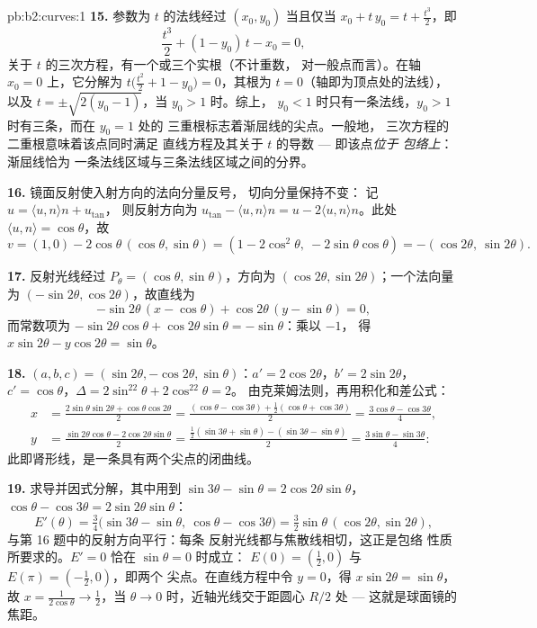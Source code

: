 \begin{solution}{pb:b2:curves:1}
\textbf{15.} 参数为 $t$ 的法线经过
$(x_0, y_0)$ 当且仅当 $x_0 + t\,y_0 = t + \tfrac{t^3}2$，即
\[
\frac{t^3}2 + (1 - y_0)\,t - x_0 = 0 ,
\]
关于 $t$ 的三次方程，有一个或三个实根（不计重数，
对一般点而言）。在轴 $x_0 = 0$ 上，它分解为
$t\bigl(\tfrac{t^2}2 + 1 - y_0\bigr) = 0$，其根为
$t = 0$（轴即为顶点处的法线），以及
$t = \pm\sqrt{2(y_0 - 1)}$，当 $y_0 > 1$ 时。综上，
$y_0 < 1$ 时只有一条法线，$y_0 > 1$ 时有三条，而在 $y_0 = 1$ 处的
三重根标志着渐屈线的尖点。一般地，
三次方程的二重根意味着该点同时满足
直线方程及其关于 $t$ 的导数 --- 即该点\emph{位于
包络上}：渐屈线恰为
一条法线区域与三条法线区域之间的分界。

\textbf{16.} 镜面反射使入射方向的法向分量反号，
切向分量保持不变：
记 $u = \langle u, n\rangle n + u_{\mathrm{tan}}$，
则反射方向为 $u_{\mathrm{tan}} - \langle u,
n\rangle n = u - 2\langle u, n\rangle n$。此处 $\langle u,
n\rangle = \cos\theta$，故
\[
v = (1, 0) - 2\cos\theta\,(\cos\theta, \sin\theta)
= (1 - 2\cos^2\theta,\ -2\sin\theta\cos\theta)
= -(\cos2\theta,\ \sin2\theta).
\]

\textbf{17.} 反射光线经过 $P_\theta =
(\cos\theta, \sin\theta)$，方向为 $(\cos2\theta,
\sin2\theta)$；一个法向量为 $(-\sin2\theta,
\cos2\theta)$，故直线为
\[
-\sin2\theta\,(x - \cos\theta) + \cos2\theta\,(y -
\sin\theta) = 0,
\]
而常数项为 $-\sin2\theta\cos\theta +
\cos2\theta\sin\theta = -\sin\theta$：乘以 $-1$，
得 $x\sin2\theta - y\cos2\theta = \sin\theta$。

\textbf{18.} $(a, b, c) = (\sin2\theta, -\cos2\theta,
\sin\theta)$：$a' = 2\cos2\theta$，$b' = 2\sin2\theta$，$c' =
\cos\theta$，$\Delta = 2\sin^22\theta + 2\cos^22\theta = 2$。
由克莱姆法则，再用积化和差公式：
\begin{align*}
x &= \frac{2\sin\theta\sin2\theta +
\cos\theta\cos2\theta}{2}
= \frac{(\cos\theta - \cos3\theta) + \frac12(\cos\theta +
\cos3\theta)}{2} = \frac{3\cos\theta - \cos3\theta}4,\\
y &= \frac{\sin2\theta\cos\theta - 2\cos2\theta\sin\theta}2
= \frac{\frac12(\sin3\theta + \sin\theta) - (\sin3\theta -
\sin\theta)}2 = \frac{3\sin\theta - \sin3\theta}4 :
\end{align*}
此即肾形线，是一条具有两个尖点的闭曲线。

\textbf{19.} 求导并因式分解，其中用到 $\sin3\theta
- \sin\theta = 2\cos2\theta\sin\theta$，$\cos\theta -
\cos3\theta = 2\sin2\theta\sin\theta$：
\[
E'(\theta) = \tfrac34\bigl(\sin3\theta - \sin\theta,\
\cos\theta - \cos3\theta\bigr)
= \tfrac32\sin\theta\,(\cos2\theta, \sin2\theta),
\]
与第 16 题中的反射方向平行：每条
反射光线都与焦散线相切，这正是包络
性质所要求的。$E' = 0$ 恰在 $\sin\theta = 0$ 时成立：
$E(0) = (\tfrac12, 0)$ 与 $E(\pi) = (-\tfrac12, 0)$，即两个
尖点。在直线方程中令 $y = 0$，得 $x\sin2\theta =
\sin\theta$，故 $x = \frac1{2\cos\theta} \to \frac12$，当
$\theta \to 0$ 时，近轴光线交于距圆心 $R/2$ 处 ---
这就是球面镜的焦距。


\end{solution}
